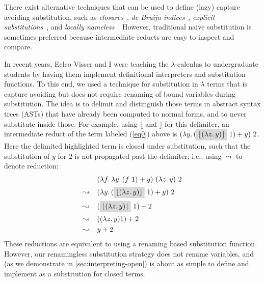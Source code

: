There exist alternative techniques that can be used to define (lazy) capture avoiding substitution, such as \emph{closures}~\cite{Landin64}, \emph{de Bruijn indices}~\cite{de_Bruijn_1972}, \emph{explicit substitutions}~\cite{AbadiCCL91}, and \emph{locally nameless}~\cite{Chargueraud12}.
However, traditional naive substitution is sometimes preferred because intermediate reducts are easy to inspect and compare.

In recent years, Eelco Visser and I were teaching the $\lambda$-calculus to undergraduate students by having them implement definitional interpreters and substitution functions.
To this end, we used a technique for substitution in $\lambda$ terms that is capture avoiding but does not require renaming of bound variables during substitution.
The idea is to delimit and distinguish those terms in abstract syntax trees (ASTs) that have already been computed to normal forms, and to never substitute inside those.
For example, using $\lfloor$ and $\rfloor$ for this delimiter, an intermediate reduct of the term labeled (\ref{eq0}) above is $(\lambda y.\, (\colorbox{gray!30}{$\lfloor (\lambda z.\, y) \rfloor$}\ 1) + y)\ 2$.
Here the delimited \colorbox{gray!30}{highlighted} term is closed under substitution, such that the substitution of $y$ for $2$ is not propagated past the delimiter; i.e., using $\leadsto$ to denote reduction:
\begin{align*}
  & (\lambda f .\, \lambda y .\, (f\ 1) + y)\ (\lambda z .\, y)\ 2
  \\
  \leadsto\quad & (\lambda y.\, (\colorbox{gray!30}{$\lfloor (\lambda z.\, y) \rfloor$}\ 1) + y)\ 2
  \\
  \leadsto\quad & (\colorbox{gray!30}{$\lfloor (\lambda z.\, y) \rfloor$}\ 1) + 2
  \\
  \leadsto\quad & ((\lambda z.\, y) 1) + 2
  \\
  \leadsto\quad & y + 2
\end{align*}
%
These reductions are equivalent to using a renaming based substitution function.
However, our renamingless substitution strategy does not rename variables, and (as we demonstrate in \cref{sec:interpreting-open}) is about as simple to define and implement as a substitution for closed terms.

